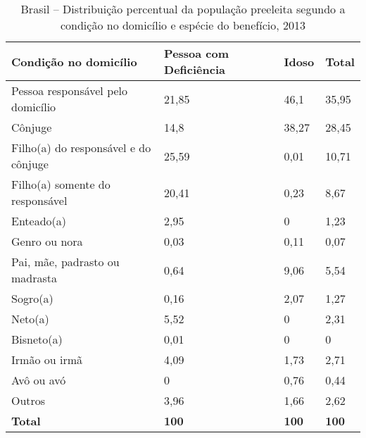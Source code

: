 \documentclass[
	12pt,				%
	openright,			%
	twoside,			%
	a4paper,			%
	english,			%
	french,				%
	spanish,			%
	brazil				%
	]{abntex2}
\begin{document}
\begin{table}[h]
	\footnotesize
	\centering
	\caption{Brasil -- Distribuição percentual da população preeleita segundo a condição no domicílio e espécie do benefício, 2013}
	\label{tab_prop_byc004_preeleito}
	\begin{tabular}{@{}llp{3cm}p{3cm}@{}}
		\toprule
		\textbf{Condição no domicílio}       & \textbf{Pessoa com Deficiência} & \textbf{Idoso} & \textbf{Total} \\ \midrule
		Pessoa responsável pelo domicílio    & 21,85                           & 46,1           & 35,95          \\
		Cônjuge                              & 14,8                            & 38,27          & 28,45          \\
		Filho(a) do responsável e do cônjuge & 25,59                           & 0,01           & 10,71          \\
		Filho(a) somente do responsável      & 20,41                           & 0,23           & 8,67           \\
		Enteado(a)                           & 2,95                            & 0              & 1,23           \\
		Genro ou nora                        & 0,03                            & 0,11           & 0,07           \\
		Pai, mãe, padrasto ou madrasta       & 0,64                            & 9,06           & 5,54           \\
		Sogro(a)                             & 0,16                            & 2,07           & 1,27           \\
		Neto(a)                              & 5,52                            & 0              & 2,31           \\
		Bisneto(a)                           & 0,01                            & 0              & 0              \\
		Irmão ou irmã                        & 4,09                            & 1,73           & 2,71           \\
		Avô ou avó                           & 0                               & 0,76           & 0,44           \\
		Outros                               & 3,96                            & 1,66           & 2,62           \\ \midrule
		\textbf{Total}                       & \textbf{100}                    & \textbf{100}   & \textbf{100}   \\ \bottomrule
	\end{tabular}
\end{table}
\end{document}
